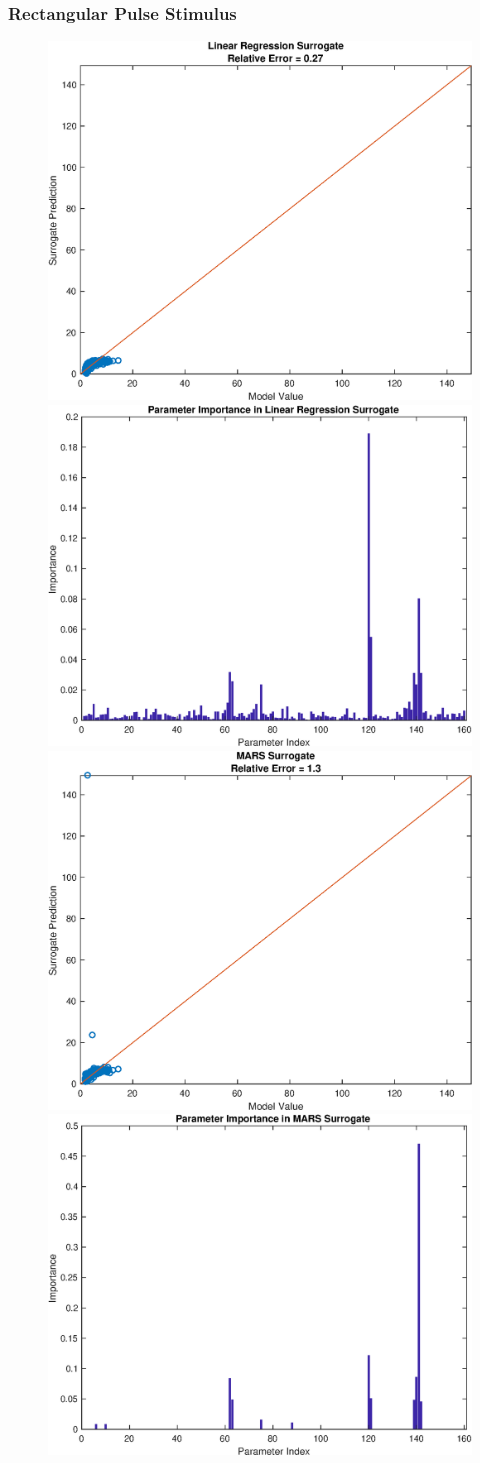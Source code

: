 \documentclass[12pt]{article}
\numberwithin{equation}{section}
\begin{document}
\subsubsection{Rectangular Pulse Stimulus}

\begin{figure}[h]
\centering
\includegraphics[width=.49 \textwidth]{Figures/AMp_Time_to_Min_QoI_LR_Prediction_Rectangular.eps}
\includegraphics[width=.49 \textwidth]{Figures/AMp_Time_to_Min_QoI_LR_VI_Rectangular.eps}\\
\includegraphics[width=.49 \textwidth]{Figures/AMp_Time_to_Min_QoI_MARS_Prediction_Rectangular.eps}
\includegraphics[width=.49 \textwidth]{Figures/AMp_Time_to_Min_QoI_MARS_VI_Rectangular.eps}
\end{figure}
\end{document}
